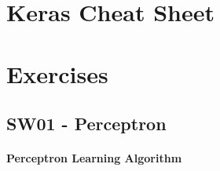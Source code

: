 \documentclass[11pt]{article}
\begin{document}
\clearpage
\newpage
\appendix

\section{Keras Cheat Sheet}


\section{Exercises}
\subsection{SW01 - Perceptron}
\paragraph{Perceptron Learning Algorithm}
\end{document}
